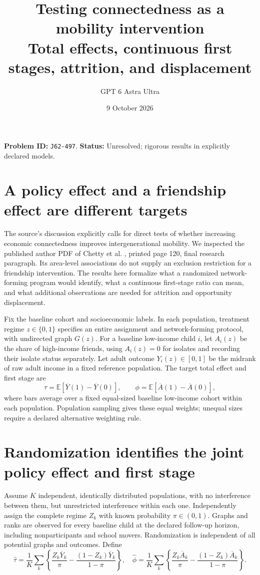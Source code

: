 \documentclass[11pt]{article}
\author{GPT 6 Astra Ultra}
\date{9 October 2026}
\title{Testing connectedness as a mobility intervention\\\large Total effects, continuous first stages, attrition, and displacement}
\theoremstyle{remark}\newtheorem{remark}[theorem]{Remark}
\newcommand{\E}{\mathbb E}
\begin{document}
\maketitle
\noindent\textbf{Problem ID:} \texttt{J62-497}. \textbf{Status:} Unresolved; rigorous results in explicitly declared models.
\section{A policy effect and a friendship effect are different targets}
The source's discussion explicitly calls for direct tests of whether increasing economic connectedness improves intergenerational mobility. We inspected the published author PDF of Chetty et al. \cite{chetty}, printed page 120, final research paragraph. Its area-level associations do not supply an exclusion restriction for a friendship intervention. The results here formalize what a randomized network-forming program would identify, what a continuous first-stage ratio can mean, and what additional observations are needed for attrition and opportunity displacement.

Fix the baseline cohort and socioeconomic labels. In each population, treatment regime $z\in\{0,1\}$ specifies an entire assignment and network-forming protocol, with undirected graph $G(z)$. For a baseline low-income child $i$, let $A_i(z)$ be the share of high-income friends, using $A_i(z)=0$ for isolates and recording their isolate status separately. Let adult outcome $Y_i(z)\in[0,1]$ be the midrank of raw adult income in a fixed reference population. The target total effect and first stage are
\[
 \tau=\E[\overline Y(1)-\overline Y(0)],\qquad
 \phi=\E[\overline A(1)-\overline A(0)],
\]
where bars average over a fixed equal-sized baseline low-income cohort within each population. Population sampling gives these equal weights; unequal sizes require a declared alternative weighting rule.

\section{Randomization identifies the joint policy effect and first stage}
Assume $K$ independent, identically distributed populations, with no interference between them, but unrestricted interference within each one. Independently assign the complete regime $Z_k$ with known probability $\pi\in(0,1)$. Graphs and ranks are observed for every baseline child at the declared follow-up horizon, including nonparticipants and school movers. Randomization is independent of all potential graphs and outcomes.
Define
\[
 \widehat\tau=\frac1K\sum_k\left\{
       \frac{Z_k\overline Y_k}{\pi}
          -\frac{(1-Z_k)\overline Y_k}{1-\pi}\right\},
 \quad
 \widehat\phi=\frac1K\sum_k\left\{
       \frac{Z_k\overline A_k}{\pi}
          -\frac{(1-Z_k)\overline A_k}{1-\pi}\right\}.
\]
\end{document}

